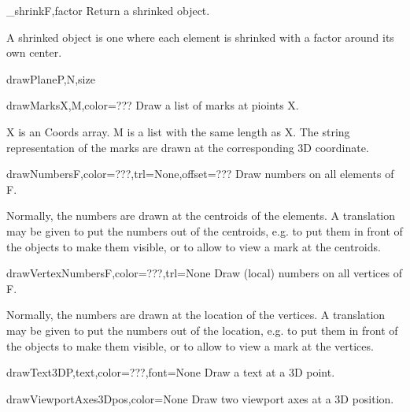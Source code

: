 \begin{funcdesc}{_shrink}{F,factor}
Return a shrinked object.

    A shrinked object is one where each element is shrinked with a factor
    around its own center.
    

\end{funcdesc}


\begin{funcdesc}{drawPlane}{P,N,size}


\end{funcdesc}


\begin{funcdesc}{drawMarks}{X,M,color=???}
Draw a list of marks at pioints X.

    X is an Coords array.
    M is a list with the same length as X.
    The string representation of the marks are drawn at the corresponding
    3D coordinate.
    

\end{funcdesc}


\begin{funcdesc}{drawNumbers}{F,color=???,trl=None,offset=???}
Draw numbers on all elements of F.

    Normally, the numbers are drawn at the centroids of the elements.
    A translation may be given to put the numbers out of the centroids,
    e.g. to put them in front of the objects to make them visible,
    or to allow to view a mark at the centroids.
    

\end{funcdesc}


\begin{funcdesc}{drawVertexNumbers}{F,color=???,trl=None}
Draw (local) numbers on all vertices of F.

    Normally, the numbers are drawn at the location of the vertices.
    A translation may be given to put the numbers out of the location,
    e.g. to put them in front of the objects to make them visible,
    or to allow to view a mark at the vertices.
    

\end{funcdesc}


\begin{funcdesc}{drawText3D}{P,text,color=???,font=None}
Draw a text at a 3D point.

\end{funcdesc}


\begin{funcdesc}{drawViewportAxes3D}{pos,color=None}
Draw two viewport axes at a 3D position.

\end{funcdesc}


